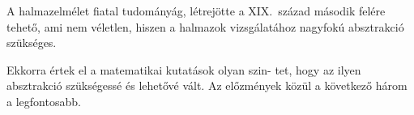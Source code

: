 \documentclass[a4paper,12pt]{article}
\begin{document}
A halmazelmélet fiatal tudományág, létrejötte a XIX.~század második
felére tehető, ami nem véletlen, hiszen a halmazok vizsgálatához nagyfokú
absztrakció szükséges.

Ekkorra értek el a matematikai kutatások olyan szin-
tet, hogy az ilyen absztrakció szükségessé és lehetővé vált. Az előzmények
közül a következő három a legfontosabb.
\end{document}
